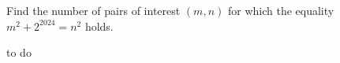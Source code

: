 Find the number of pairs of interest $(m,n)$ for which the equality ${m^{2}+2^{2024}=n^{2}}$ holds. 

\begin{answer}
to do
\end{answer}
